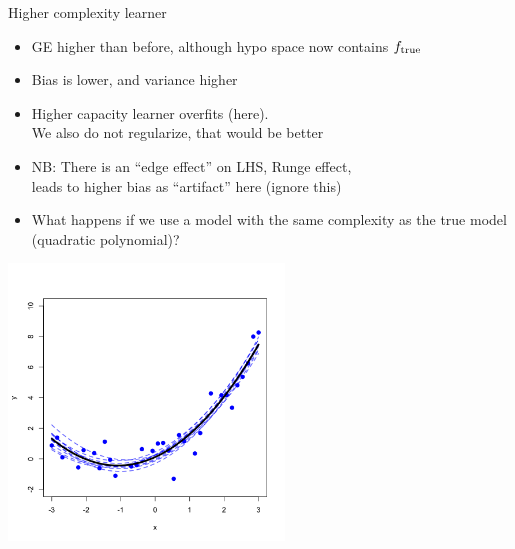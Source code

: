 \documentclass[11pt,compress,t,notes=noshow, xcolor=table]{beamer}
\begin{document}
\begin{vbframe} {Higher complexity learner}
\begin{itemize}
$$GE_n\left(\ind\right) \approx 1 + 0.139 + 1.963 \approx 3.103 $$

\vfill


\item GE higher than before, although hypo space now contains $f_{\text{true}}$
\item Bias is lower, and variance higher 
\item Higher capacity learner overfits (here).\\
   We also do not regularize, that would be better
   
\item NB: There is an ``edge effect'' on LHS, Runge effect,\\
  leads to higher bias as ``artifact'' here (ignore this)


\framebreak

\item What happens if we use a model with the same complexity as the true model (quadratic polynomial)? 
\end{itemize}

\begin{center}
  \includegraphics[width = 0.55\textwidth]{figure/bias_variance_decomposition-correct_model.png}
\end{center}

\framebreak


\end{vbframe}
\end{document}
